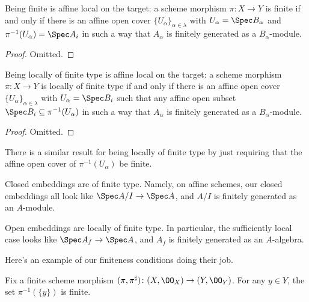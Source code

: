 \documentclass[../notes.tex]{subfiles}
\begin{document}
\begin{lemma}
	Being finite is affine local on the target: a scheme morphism $\pi\colon X\to Y$ is finite if and only if there is an affine open cover $\{U_\alpha\}_{\alpha\in\lambda}$ with $U_\alpha=\Spec B_\alpha$ and $\pi^{-1}(U_\alpha)=\Spec A_i$ in such a way that $A_\alpha$ is finitely generated as a $B_\alpha$-module.
\end{lemma}
\begin{proof}
	Omitted.
\end{proof}
\begin{lemma}
	Being locally of finite type is affine local on the target: a scheme morphism $\pi\colon X\to Y$ is locally of finite type if and only if there is an affine open cover $\{U_\alpha\}_{\alpha\in\lambda}$ with $U_\alpha=\Spec B_i$ such that any affine open subset $\Spec B_i\subseteq\pi^{-1}(U_\alpha)$ in such a way that $A_\alpha$ is finitely generated as a $B_\alpha$-module.
\end{lemma}
\begin{proof}
	Omitted.
\end{proof}
There is a similar result for being locally of finite type by just requiring that the affine open cover of $\pi^{-1}(U_\alpha)$ be finite.
\begin{remark}
	Closed embeddings are of finite type. Namely, on affine schemes, our closed embeddings all look like $\Spec A/I\to\Spec A$, and $A/I$ is finitely generated as an $A$-module.
\end{remark}
\begin{remark}
	Open embeddings are locally of finite type. In particular, the sufficiently local case looks like $\Spec A_f\to\Spec A$, and $A_f$ is finitely generated as an $A$-algebra.
\end{remark}
Here's an example of our finiteness conditions doing their job.
\begin{lemma}
	Fix a finite scheme morphism $(\pi,\pi^\sharp)\colon (X,\OO_X)\to (Y,\OO_Y)$. For any $y\in Y$, the set $\pi^{-1}(\{y\})$ is finite.
\end{lemma}
\end{document}
